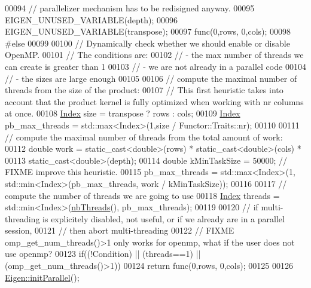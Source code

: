 \begin{DoxyCode}
00094   \textcolor{comment}{// parallelizer mechanism has to be redisigned anyway.}
00095   EIGEN\_UNUSED\_VARIABLE(depth);
00096   EIGEN\_UNUSED\_VARIABLE(transpose);
00097   func(0,rows, 0,cols);
00098 \textcolor{preprocessor}{#else}
00099 
00100   \textcolor{comment}{// Dynamically check whether we should enable or disable OpenMP.}
00101   \textcolor{comment}{// The conditions are:}
00102   \textcolor{comment}{// - the max number of threads we can create is greater than 1}
00103   \textcolor{comment}{// - we are not already in a parallel code}
00104   \textcolor{comment}{// - the sizes are large enough}
00105 
00106   \textcolor{comment}{// compute the maximal number of threads from the size of the product:}
00107   \textcolor{comment}{// This first heuristic takes into account that the product kernel is fully optimized when working with
       nr columns at once.}
00108   \hyperlink{namespace_eigen_a62e77e0933482dafde8fe197d9a2cfde}{Index} size = transpose ? rows : cols;
00109   \hyperlink{namespace_eigen_a62e77e0933482dafde8fe197d9a2cfde}{Index} pb\_max\_threads = std::max<Index>(1,size / Functor::Traits::nr);
00110 
00111   \textcolor{comment}{// compute the maximal number of threads from the total amount of work:}
00112   \textcolor{keywordtype}{double} work = \textcolor{keyword}{static\_cast<}\textcolor{keywordtype}{double}\textcolor{keyword}{>}(rows) * static\_cast<double>(cols) *
00113       \textcolor{keyword}{static\_cast<}\textcolor{keywordtype}{double}\textcolor{keyword}{>}(depth);
00114   \textcolor{keywordtype}{double} kMinTaskSize = 50000;  \textcolor{comment}{// FIXME improve this heuristic.}
00115   pb\_max\_threads = std::max<Index>(1, std::min<Index>(pb\_max\_threads, work / kMinTaskSize));
00116 
00117   \textcolor{comment}{// compute the number of threads we are going to use}
00118   \hyperlink{namespace_eigen_a62e77e0933482dafde8fe197d9a2cfde}{Index} threads = std::min<Index>(\hyperlink{namespace_eigen_a9aca97d83e21b91a04ec079360dfffeb}{nbThreads}(), pb\_max\_threads);
00119 
00120   \textcolor{comment}{// if multi-threading is explicitely disabled, not useful, or if we already are in a parallel session,}
00121   \textcolor{comment}{// then abort multi-threading}
00122   \textcolor{comment}{// FIXME omp\_get\_num\_threads()>1 only works for openmp, what if the user does not use openmp?}
00123   \textcolor{keywordflow}{if}((!Condition) || (threads==1) || (omp\_get\_num\_threads()>1))
00124     \textcolor{keywordflow}{return} func(0,rows, 0,cols);
00125 
00126   \hyperlink{namespace_eigen_a820c0e0460934cc17eb6dacbad54a9f5}{Eigen::initParallel}();

\end{DoxyCode}
